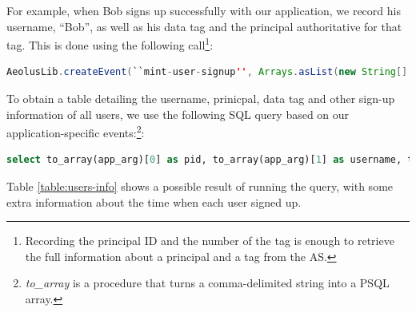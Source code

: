 For example, when Bob signs up successfully with our application, we record his username, ``Bob'', as well as his data tag and the principal authoritative for that tag. This is done using the following call\footnote{Recording the principal ID and the number of the tag is enough to retrieve the full information about a principal and a tag from the AS.}:

\begin{lstlisting}[language=Java, label=code:create-event]
  AeolusLib.createEvent(``mint-user-signup'', Arrays.asList(new String[] {``Bob'', ``5'', ``10''}));
\end{lstlisting}

To obtain a table detailing the username, prinicpal, data tag and other sign-up information of all users, we use the following SQL query based on our application-specific events:\footnote{\emph{to\_array} is a procedure that turns a comma-delimited string into a PSQL array.}:

\begin{lstlisting}[language=SQL, deletendkeywords={TIMESTAMP}, label=code:mint-signup]
select to_array(app_arg)[0] as pid, to_array(app_arg)[1] as username, to_array(app_arg)[2] as tag, timestamp as signed_up, event_counter from events where op_name='mint-user-signup'
\end{lstlisting}

\noindent
Table \ref{table:users-info} shows a possible result of running the query, with some extra information about the time when each user signed up.

